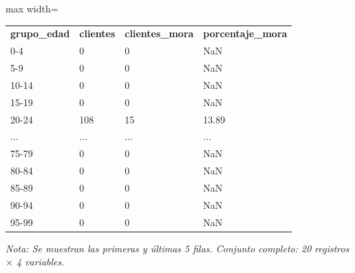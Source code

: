 

\begin{table}[htbp]

\centering

\begin{adjustbox}{max width=\textwidth}

\begin{tabular}{llll}

\rowcolor{ThemeBackground}
\rule{0pt}{0.45cm}
\textcolor{ThemeGold}{\bfseries grupo\_edad} & \textcolor{ThemeGold}{\bfseries clientes} & \textcolor{ThemeGold}{\bfseries clientes\_mora} & \textcolor{ThemeGold}{\bfseries porcentaje\_mora} \\

0-4 & 0 & 0 & NaN \\
5-9 & 0 & 0 & NaN \\
10-14 & 0 & 0 & NaN \\
15-19 & 0 & 0 & NaN \\
20-24 & 108 & 15 & 13.89 \\
... & ... & ... & ... \\
75-79 & 0 & 0 & NaN \\
80-84 & 0 & 0 & NaN \\
85-89 & 0 & 0 & NaN \\
90-94 & 0 & 0 & NaN \\
95-99 & 0 & 0 & NaN \\
\bottomrule
\end{tabular}

\end{adjustbox}

\vspace{0.15cm}
{\raggedright\sffamily\footnotesize\color{ThemeMuted}
\textit{Nota: Se muestran las primeras y últimas 5 filas. Conjunto completo: 20 registros $\times$ 4 variables.}}

\end{table}
